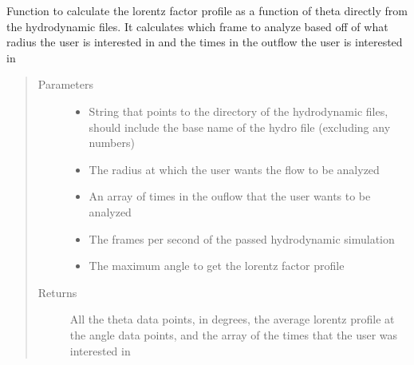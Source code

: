 \documentclass[letterpaper,10pt,english]{sphinxmanual}
\begin{document}
\begin{fulllineitems}
\label{\detokenize{read_process_files:read_process_files.fluidGammaVsTheta}}
Function to calculate the lorentz factor profile as a function of theta directly from the hydrodynamic files.
It calculates which frame to analyze based off of what radius the user is interested in and the times in the outflow
the user is interested in
\begin{quote}\begin{description}
\item[{Parameters}] \leavevmode\begin{itemize}
\item {} 
 \textendash{} String that points to the directory of the hydrodynamic files, should include the base name of the
hydro file (excluding any numbers)

\item {} 
 \textendash{} The radius at which the user wants the flow to be analyzed

\item {} 
 \textendash{} An array of times in the ouflow that the user wants to be analyzed

\item {} 
 \textendash{} The frames per second of the passed hydrodynamic simulation

\item {} 
 \textendash{} The maximum angle to get the lorentz factor profile

\end{itemize}

\item[{Returns}] \leavevmode
All the theta data points, in degrees, the average lorentz profile at the angle data points, and the array
of the times that the user was interested in

\end{description}\end{quote}

\end{fulllineitems}
\end{document}
